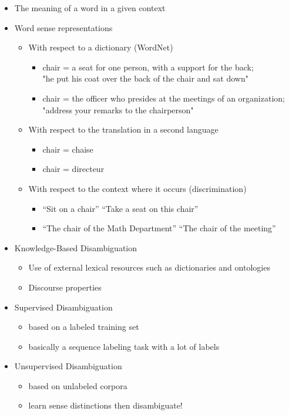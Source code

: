 \documentclass[a4paper,landscape,headrule,footrule,xetex]{foils}
\begin{document}
\begin{itemize}
\item The meaning of a word in a given context
\item Word sense representations
  \begin{itemize}
\item With respect to a dictionary (WordNet)
  \begin{itemize}
  \item  chair = a seat for one person, with a support for the back; 
    \\ "he put his coat over the back of the chair and sat down"
  \item chair = the officer who presides at the meetings of an organization; 
    \\"address your remarks to the chairperson"
  \end{itemize}
\item   With respect to the translation in a second language
  \begin{itemize}
  \item   chair = chaise
  \item      chair = directeur
  \end{itemize}
\item With respect to the context where it occurs (discrimination)
    \begin{itemize}
    \item ``Sit on a chair''  ``Take a seat on this chair''
    \item ``The chair of the Math Department'' ``The chair of the meeting''
    \end{itemize}
  \end{itemize}
\end{itemize}


\begin{itemize}
\item Knowledge-Based Disambiguation
  \begin{itemize}
  \item Use of external lexical resources such as dictionaries and ontologies
  \item Discourse properties
  \end{itemize}
\item Supervised Disambiguation
  \begin{itemize}
  \item based on a labeled training set
  \item basically a sequence labeling task with a lot of labels
  \end{itemize}
\item Unsupervised Disambiguation
  \begin{itemize}
  \item based on unlabeled corpora
  \item learn sense distinctions then disambiguate!
  \end{itemize}

\end{itemize}
\end{document}
